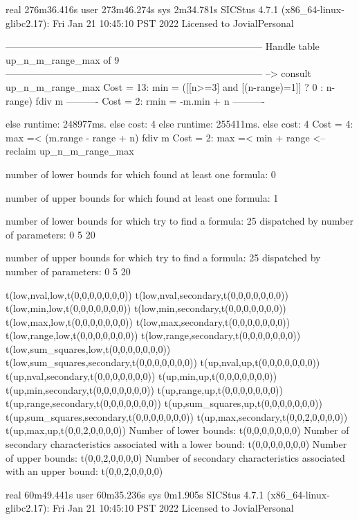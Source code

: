 real	276m36.416s
user	273m46.274s
sys	2m34.781s
SICStus 4.7.1 (x86_64-linux-glibc2.17): Fri Jan 21 10:45:10 PST 2022
Licensed to JovialPersonal


--------------------------------------------------------------------------------
Handle table up_n_m_range_max of 9
--------------------------------------------------------------------------------
--> consult up_n_m_range_max
Cost = 13:  min  = ([[n>=3] and [(n-range)=1]] ? 0 : n-range) fdiv m %
----------
Cost =  2:  rmin = -m.min + n
----------

else runtime: 248977ms. else cost: 4
else runtime: 255411ms. else cost: 4
Cost =  4:  max =< (m.range - range + n) fdiv m %
Cost =  2:  max =< min + range
<-- reclaim up_n_m_range_max

number of lower bounds for which found at least one formula: 0

number of upper bounds for which found at least one formula: 1

number of lower bounds for which try to find a formula: 25
dispatched by number of parameters: 0  5  20

number of upper bounds for which try to find a formula: 25
dispatched by number of parameters: 0  5  20

t(low,nval,low,t(0,0,0,0,0,0,0))
t(low,nval,secondary,t(0,0,0,0,0,0,0))
t(low,min,low,t(0,0,0,0,0,0,0))
t(low,min,secondary,t(0,0,0,0,0,0,0))
t(low,max,low,t(0,0,0,0,0,0,0))
t(low,max,secondary,t(0,0,0,0,0,0,0))
t(low,range,low,t(0,0,0,0,0,0,0))
t(low,range,secondary,t(0,0,0,0,0,0,0))
t(low,sum_squares,low,t(0,0,0,0,0,0,0))
t(low,sum_squares,secondary,t(0,0,0,0,0,0,0))
t(up,nval,up,t(0,0,0,0,0,0,0))
t(up,nval,secondary,t(0,0,0,0,0,0,0))
t(up,min,up,t(0,0,0,0,0,0,0))
t(up,min,secondary,t(0,0,0,0,0,0,0))
t(up,range,up,t(0,0,0,0,0,0,0))
t(up,range,secondary,t(0,0,0,0,0,0,0))
t(up,sum_squares,up,t(0,0,0,0,0,0,0))
t(up,sum_squares,secondary,t(0,0,0,0,0,0,0))
t(up,max,secondary,t(0,0,2,0,0,0,0))
t(up,max,up,t(0,0,2,0,0,0,0))
Number of lower bounds:                                             t(0,0,0,0,0,0,0)
Number of secondary characteristics associated with a lower bound:  t(0,0,0,0,0,0,0)
Number of upper bounds:                                             t(0,0,2,0,0,0,0)
Number of secondary characteristics associated with an upper bound: t(0,0,2,0,0,0,0)

real	60m49.441s
user	60m35.236s
sys	0m1.905s
SICStus 4.7.1 (x86_64-linux-glibc2.17): Fri Jan 21 10:45:10 PST 2022
Licensed to JovialPersonal


